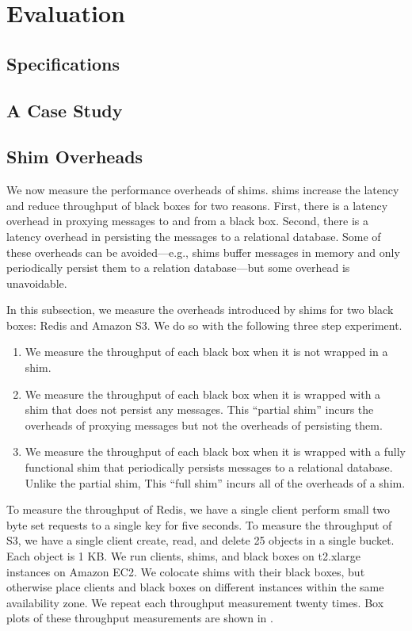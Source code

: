 \section{Evaluation}


\subsection{\WatProvenance{} Specifications}
\subsection{A Case Study}

\subsection{Shim Overheads}
We now measure the performance overheads of \fluent{} shims. \fluent{} shims
increase the latency and reduce throughput of black boxes for two reasons.
First, there is a latency overhead in proxying messages to and from a black
box. Second, there is a latency overhead in persisting the messages to a
relational database.  Some of these overheads can be avoided---e.g., \fluent{}
shims buffer messages in memory and only periodically persist them to a
relation database---but some overhead is unavoidable.

In this subsection, we measure the overheads introduced by \fluent{} shims for
two black boxes: Redis and Amazon S3. We do so with the following three step
experiment.
\begin{enumerate}
  \item
    We measure the throughput of each black box when it is not wrapped in a
    \fluent{} shim.
  \item
    We measure the throughput of each black box when it is wrapped with a
    \fluent{} shim that does not persist any messages. This ``partial shim''
    incurs the overheads of proxying messages but not the overheads of
    persisting them.
  \item
    We measure the throughput of each black box when it is wrapped with a fully
    functional \fluent{} shim that periodically persists messages to a
    relational database. Unlike the partial shim, This ``full shim'' incurs all
    of the overheads of a \fluent{} shim.
\end{enumerate}

To measure the throughput of Redis, we have a single client perform small two
byte set requests to a single key for five seconds. To measure the throughput
of S3, we have a single client create, read, and delete 25 objects in a single
bucket. Each object is 1 KB. We run clients, shims, and black boxes on
t2.xlarge instances on Amazon EC2. We colocate shims with their black boxes,
but otherwise place clients and black boxes on different instances within the
same availability zone. We repeat each throughput measurement twenty times.
Box plots of these throughput measurements are shown in .

